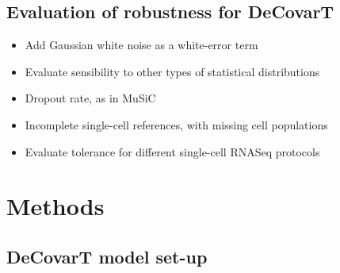 \documentclass[pdflatex, sn-nature]{sn-jnl}
\theoremstyle{thmstyleone}%
\theoremstyle{thmstyletwo}%
\theoremstyle{thmstylethree}%
\begin{document}
    \subsection{Evaluation of robustness for DeCovarT}


    \begin{itemize}
        \item Add Gaussian white noise as a white-error term

        \item Evaluate sensibility to other types of statistical distributions \cite{wangBulkTissueCell2019}

        \item Dropout rate, as in MuSiC \cite{wangBulkTissueCell2019}

        \item Incomplete single-cell references, with missing cell populations
            \cite{wangBulkTissueCell2019}

        \item Evaluate tolerance for different single-cell RNASeq protocols \cite{wangBulkTissueCell2019}
    \end{itemize}

    \section{Methods}

    \subsection{DeCovarT model set-up}
\end{document}

